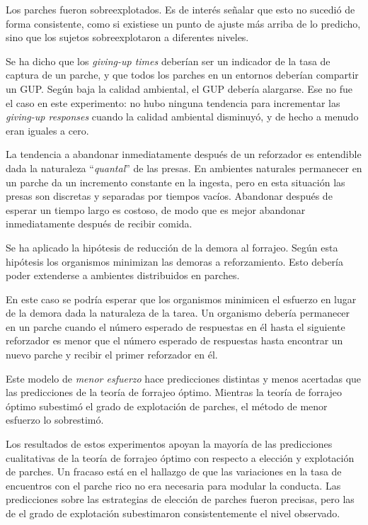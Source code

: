 \documentclass[a4paper,12pt]{article}
\begin{document}
Los parches fueron sobreexplotados. Es de interés señalar que esto no sucedió de forma consistente, como si existiese un punto de ajuste más arriba de lo predicho, sino que los sujetos sobreexplotaron a diferentes niveles.

Se ha dicho que los {\itshape giving-up times} deberían ser un indicador de la tasa de captura de un parche, y que todos los parches en un entornos deberían compartir un GUP. Según baja la calidad ambiental, el GUP debería alargarse. Ese no fue el caso en este experimento: no hubo ninguna tendencia para incrementar las {\itshape giving-up responses} cuando la calidad ambiental disminuyó, y de hecho a menudo eran iguales a cero.

La tendencia a abandonar inmediatamente después de un reforzador es entendible dada la naturaleza ``{\itshape quantal}'' de las presas. En ambientes naturales permanecer en un parche da un incremento constante en la ingesta, pero en esta situación las presas son discretas y separadas por tiempos vacíos. Abandonar después de esperar un tiempo largo es costoso, de modo que es mejor abandonar inmediatamente después de recibir comida.

Se ha aplicado la hipótesis de reducción de la demora al forrajeo. Según esta hipótesis los organismos minimizan las demoras a reforzamiento. Esto debería poder extenderse a ambientes distribuidos en parches.

En este caso se podría esperar que los organismos minimicen el esfuerzo en lugar de la demora dada la naturaleza de la tarea. Un organismo debería permanecer en un parche cuando el número esperado de respuestas en él hasta el siguiente reforzador es menor que el número esperado de respuestas hasta encontrar un nuevo parche y recibir el primer reforzador en él.

Este modelo de {\itshape menor esfuerzo} hace predicciones distintas y menos acertadas que las predicciones de la teoría de forrajeo óptimo. Mientras la teoría de forrajeo óptimo subestimó el grado de explotación de parches, el método de menor esfuerzo lo sobrestimó.

Los resultados de estos experimentos apoyan la mayoría de las predicciones cualitativas de la teoría de forrajeo óptimo con respecto a elección y explotación de parches. Un fracaso está en el hallazgo de que las variaciones en la tasa de encuentros con el parche rico no era necesaria para modular la conducta. Las predicciones sobre las estrategias de elección de parches fueron precisas, pero las de el grado de explotación subestimaron consistentemente el nivel observado.
\end{document}
